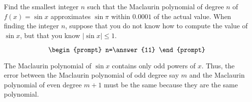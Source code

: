 \documentclass{ximera}
\author{Gregory Hartman \and Matthew Carr}
\begin{document}
\begin{exercise}





Find the smallest integer $n$ such that the Maclaurin polynomial of degree $n$ of $f(x)=\sin x$ approximates $\sin \pi$ within $0.0001$ of the actual value. When finding the integer $n$, suppose that you do not know how to compute the value of $\sin x$, but that you know $|\sin x|\le 1$.

\[
\begin{prompt}
n=\answer{11}
\end{prompt}
\]

\begin{hint}
The Maclaurin polynomial of $\sin x$ contains only odd powers of $x$. Thus, the error between the Maclaurin polynomial of odd degree say $m$ and the Maclaurin polynomial of even degree $m+1$ must be the same because they are the same polynomial.
\end{hint}

\end{exercise}
\end{document}
